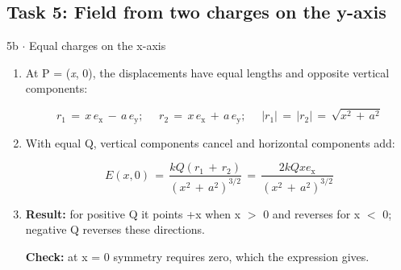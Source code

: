 \documentclass[11pt]{article}
\begin{document}
\begin{keepsection}\subsection{Task 5: Field from two charges on the y-axis}

\begin{workedbox}{5b \ensuremath{\cdot} Equal charges on the x-axis}
\begin{enumerate}
\item {}
At P = (\textit{x}, 0), the displacements have equal lengths and opposite vertical components:

\begin{equation*}{r}_{1}\, =\, {x\,e}_{\mathrm{x}}\, -\, {a\,e}_{\mathrm{y}};\, \quad \, {r}_{2}\, =\, {x\,e}_{\mathrm{x}}\, +\, {a\,e}_{\mathrm{y}};\, \quad \, |{r}_{1}|\, =\, |{r}_{2}|\, =\, \sqrt{{x}^{2}\, +\, {a}^{2}}\end{equation*}
\item {}
With equal Q, vertical components cancel and horizontal components add:

\begin{equation*}{E}({x},0)\, =\, \dfrac{{kQ}({r}_{1}\, +\, {r}_{2})}{({x}^{2}\, +\, {a}^{2})^{3/2}}\, =\, \dfrac{2{kQx}{e}_{\mathrm{x}}}{({x}^{2}\, +\, {a}^{2})^{3/2}}\end{equation*}
\item {}
\textbf{Result:} for positive Q it points +x when x \ensuremath{>} 0 and reverses for x \ensuremath{<} 0; negative Q reverses these directions.

\textbf{Check:} at x = 0 symmetry requires zero, which the expression gives.


\end{enumerate}
\end{workedbox}
\end{keepsection}
\end{document}
